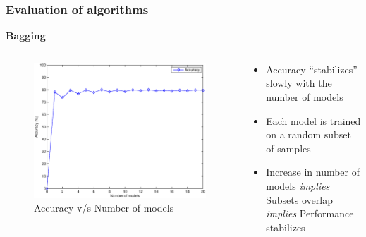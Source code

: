 \documentclass{beamer}
\begin{document}
    \begin{frame}
        \frametitle{Evaluation of algorithms}
        \begin{center}
            \textbf{Bagging}
        \end{center}
        \begin{columns}
            \begin{column}{0.5\textwidth}
                \begin{figure}
                    \centering
                    \includegraphics[width=\textwidth]{figures/bagging_n_models.eps}
                    \caption{Accuracy v/s Number of models}
                \end{figure}
            \end{column}
            \begin{column}{0.5\textwidth}
                \begin{itemize}
                    \item{Accuracy ``stabilizes'' slowly with the number of models}
                    \item{Each model is trained on a random subset of samples}
                    \item{Increase in number of models \emph{implies} Subsets overlap \emph{implies} Performance stabilizes}
                \end{itemize}
            \end{column}
        \end{columns}
    \end{frame}
    
\end{document}
